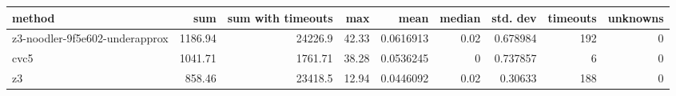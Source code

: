 \begin{tabular}{lrrrrrrrr}
\hline
 method                         &     sum &   sum with timeouts &   max &      mean &   median &   std. dev &   timeouts &   unknowns \\
\hline
 z3-noodler-9f5e602-underapprox & 1186.94 &            24226.9  & 42.33 & 0.0616913 &     0.02 &   0.678984 &        192 &          0 \\
 cvc5                           & 1041.71 &             1761.71 & 38.28 & 0.0536245 &     0    &   0.737857 &          6 &          0 \\
 z3                             &  858.46 &            23418.5  & 12.94 & 0.0446092 &     0.02 &   0.30633  &        188 &          0 \\
\hline
\end{tabular}
